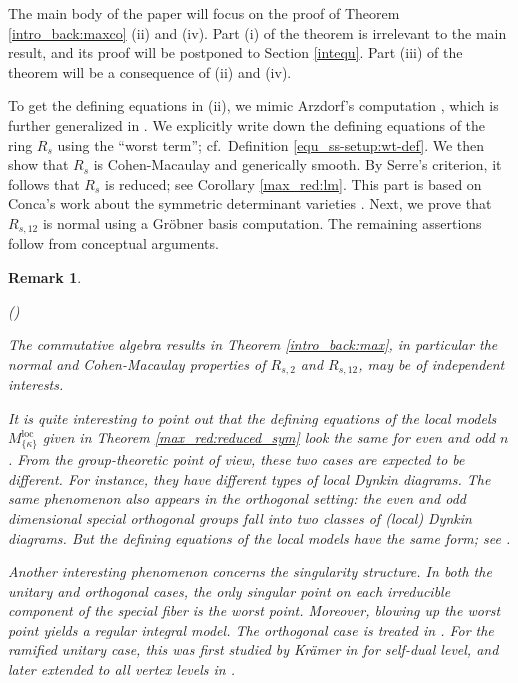 \documentclass[pdflatex,sn-mathphys-num]{sn-jnl}%
\theoremstyle{thmstyleone}%
\theoremstyle{thmstyletwo}%
\newtheorem{remark}[subsubsection]{Remark}%
\numberwithin{equation}{subsection}
\theoremstyle{thmstylethree}%
\newcommand{\loc}{\ensuremath{\mathrm{loc}}\xspace}
\newenvironment{altenumerate}
	{\begin{list}
			{(\theenumi) }
			{\usecounter{enumi}
				\setlength{\labelwidth}{0pt}
				\setlength{\labelsep}{0pt}
				\setlength{\leftmargin}{0pt}
				\setlength{\itemsep}{\the\smallskipamount}
				\renewcommand{\theenumi}{\roman{enumi}}
		}}
		{\end{list}}
\begin{document}
The main body of the paper will focus on the proof of Theorem \ref{intro_back:maxco} (ii) and (iv). Part (i) of the theorem is irrelevant to the main result, and its proof will be postponed to Section \ref{intequ}. Part (iii) of the theorem will be a consequence of (ii) and (iv).


To get the defining equations in (ii), we mimic Arzdorf's computation \cite{Arzdorf2009}, which is further generalized in \cite{Smithling2015, Yu2019}.
We explicitly write down the defining equations of the ring $R_s$ using the ``worst term''; cf.\ Definition \ref{equ_ss-setup:wt-def}.
We then show that $R_s$ is Cohen-Macaulay and generically smooth. By Serre’s criterion, it follows that $R_s$ is reduced; see Corollary \ref{max_red:lm}.
This part is based on Conca's work about the symmetric determinant varieties \cite{Conca1994-1,Conca1994-2}.
Next, we prove that $R_{s,12}$ is normal using a Gr\"obner basis computation.
The remaining assertions follow from conceptual arguments.

\begin{remark}
\begin{altenumerate}
\item The commutative algebra results in Theorem \ref{intro_back:max}, in particular the normal and Cohen-Macaulay properties of $R_{s,2}$ and $R_{s,12}$, may be of independent interests.
\item It is quite interesting to point out that the defining equations of the local models $M^\loc_{\{\kappa\}}$ given in Theorem \ref{max_red:reduced_sym} look the same for even and odd $n$. 
From the group-theoretic point of view, these two cases are expected to be different. For instance, they have different types of local Dynkin diagrams. 
The same phenomenon also appears in the orthogonal setting: the even and odd dimensional special orthogonal groups fall into two classes of (local) Dynkin diagrams. But the defining equations of the local models have the same form; see \cite{Zachos}.

Another interesting phenomenon concerns the singularity structure. In both the unitary and orthogonal cases, the only singular point on each irreducible component of the special fiber is the worst point. Moreover, blowing up the worst point yields a regular integral model. The orthogonal case is treated in \cite{PZa2022}.
For the ramified unitary case, this was first studied by Kr\"amer in \cite{Kramer} for self-dual level, and later extended to all vertex levels in \cite{HLS-regular}.
\end{altenumerate}
\end{remark}
		
\end{document}
